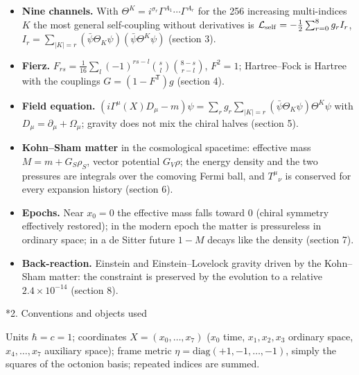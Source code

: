 \documentclass[10pt,a4paper]{article}
\makeatletter
\renewcommand\section{\@startsection{section}{1}{\z@}{-3.5ex \@plus -1ex \@minus -.2ex}{2.3ex \@plus.2ex}{\normalfont\Large\bfseries\raggedright}}
\makeatother
\begin{document}
\begin{itemize}
\item \textbf{Nine channels.} With $\Theta^K=i^{\sigma_r}\Gamma^{A_1}\cdots\Gamma^{A_r}$ for the 256 increasing multi-indices $K$ the most general self-coupling without derivatives is $\mathcal L_{\rm self}=-\tfrac12\sum_{r=0}^{8}g_rI_r$, $I_r=\sum_{|K|=r}(\bar\psi\Theta_K\psi)(\bar\psi\Theta^K\psi)$ (section 3).
\item \textbf{Fierz.} $F_{rs}=\frac1{16}\sum_l(-1)^{rs-l}\binom{s}{l}\binom{8-s}{r-l}$, $F^2=1$; Hartree–Fock is Hartree with the couplings $G=(1-F^{\mathsf T})g$ (section 4).
\item \textbf{Field equation.} $(i\Gamma^\mu(X)D_\mu-m)\psi=\sum_rg_r\sum_{|K|=r}(\bar\psi\Theta_K\psi)\Theta^K\psi$ with $D_\mu=\partial_\mu+\Omega_\mu$; gravity does not mix the chiral halves (section 5).
\item \textbf{Kohn–Sham matter} in the cosmological spacetime: effective mass $M=m+G_S\rho_S$, vector potential $G_V\rho$; the energy density and the two pressures are integrals over the comoving Fermi ball, and $T^\mu{}_\nu$ is conserved for every expansion history (section 6).
\item \textbf{Epochs.} Near $x_0=0$ the effective mass falls toward 0 (chiral symmetry effectively restored); in the modern epoch the matter is pressureless in ordinary space; in a de Sitter future $1-M$ decays like the density (section 7).
\item \textbf{Back-reaction.} Einstein and Einstein–Lovelock gravity driven by the Kohn–Sham matter: the constraint is preserved by the evolution to a relative $2.4\times10^{-14}$ (section 8).
\end{itemize}
\section*{2. Conventions and objects used}
Units $\hbar=c=1$; coordinates $X=(x_0,\dots,x_7)$ ($x_0$ time, $x_1,x_2,x_3$ ordinary space, $x_4,\dots,x_7$ auxiliary space); frame metric $\eta=\mathrm{diag}(+1,-1,\dots,-1)$, simply the squares of the octonion basis; repeated indices are summed.
\end{document}
